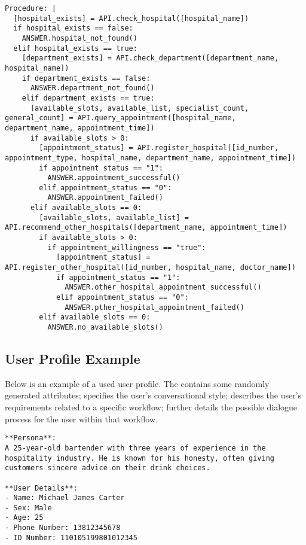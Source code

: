 \begin{envnew}
\begin{lstlisting}[language={}, caption=Example of PDL]
Procedure: |
  [hospital_exists] = API.check_hospital([hospital_name])
  if hospital_exists == false:
    ANSWER.hospital_not_found()
  elif hospital_exists == true:
    [department_exists] = API.check_department([department_name, hospital_name])
    if department_exists == false:
      ANSWER.department_not_found()
    elif department_exists == true:
      [available_slots, available_list, specialist_count, general_count] = API.query_appointment([hospital_name, department_name, appointment_time])
      if available_slots > 0:
        [appointment_status] = API.register_hospital([id_number, appointment_type, hospital_name, department_name, appointment_time])
        if appointment_status == "1":
          ANSWER.appointment_successful()
        elif appointment_status == "0":
          ANSWER.appointment_failed()
      elif available_slots == 0:
        [available_slots, available_list] = API.recommend_other_hospitals([department_name, appointment_time])
        if available_slots > 0:
          if appointment_willingness == "true":
            [appointment_status] = API.register_other_hospital([id_number, hospital_name, doctor_name])
            if appointment_status == "1":
              ANSWER.other_hospital_appointment_successful()
            elif appointment_status == "0":
              ANSWER.pther_hospital_appointment_failed()
        elif available_slots == 0:
          ANSWER.no_available_slots()
\end{lstlisting}


\subsection{User Profile Example} \label{appendix:user_profile_example}
Below is an example of a used user profile. The  contains some randomly generated attributes;  specifies the user's conversational style;  describes the user's requirements related to a specific workflow;  further details the possible dialogue process for the user within that workflow.

\begin{lstlisting}[language={}, caption=Example of user profile]
**Persona**:  
A 25-year-old bartender with three years of experience in the hospitality industry. He is known for his honesty, often giving customers sincere advice on their drink choices.

**User Details**:  
- Name: Michael James Carter  
- Sex: Male  
- Age: 25  
- Phone Number: 13812345678  
- ID Number: 110105199801012345  


\end{lstlisting}
\end{envnew}
